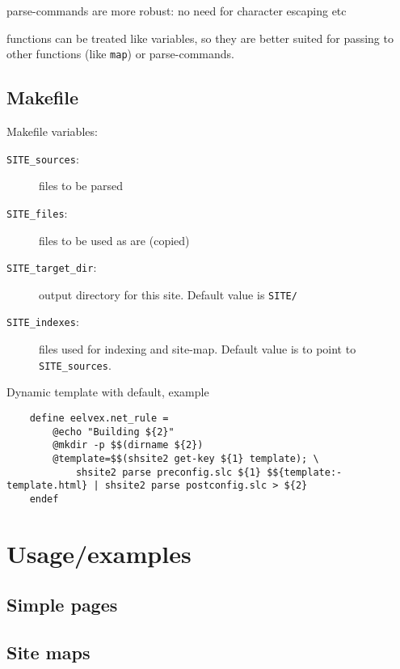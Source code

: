 \documentclass{memoir}
\begin{document}
			parse-commands are more robust: no need for character escaping etc

			functions can be treated like variables, so they are better
			suited for passing to other functions (like \texttt{map}) or parse-commands.




	\section{Makefile} %

	Makefile variables:
	\begin{description}
	\item[\texttt{SITE\_sources}:] files to be parsed
	\item[\texttt{SITE\_files}:] files to be used as are (copied)
	\item[\texttt{SITE\_target\_dir}:] output directory for this site. Default value is \texttt{SITE/}
	\item[\texttt{SITE\_indexes}:] files used for indexing and site-map. Default value is to point to \texttt{SITE\_sources}.
	\end{description}

	Dynamic template with default, example
	\tabson
	\begin{verbatim}
	define eelvex.net_rule =
		@echo "Building ${2}"
		@mkdir -p $$(dirname ${2})
		@template=$$(shsite2 get-key ${1} template); \
			shsite2 parse preconfig.slc ${1} $${template:-template.html} | shsite2 parse postconfig.slc > ${2}
	endef
	\end{verbatim}






\chapter{Usage/examples} %

	\section{Simple pages} %


	\section{Site maps} %
\end{document}

